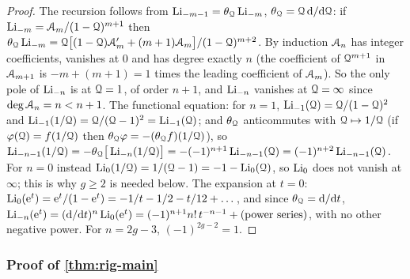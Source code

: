\begin{proof}
The recursion follows from $\Li_{-m-1}=\thQ\Li_{-m}$, $\thQ=\cQ\,\dd/\dd\cQ$: if $\Li_{-m}=\Aeul_m/(1-\cQ)^{m+1}$ then $\thQ\Li_{-m}=\cQ\big[(1-\cQ)\Aeul_m'+(m+1)\Aeul_m\big]/(1-\cQ)^{m+2}$. By induction $\Aeul_n$ has integer coefficients, vanishes at $0$ and has degree exactly $n$ (the coefficient of $\cQ^{m+1}$ in $\Aeul_{m+1}$ is $-m+(m+1)=1$ times the leading coefficient of $\Aeul_m$). So the only pole of $\Li_{-n}$ is at $\cQ=1$, of order $n+1$, and $\Li_{-n}$ vanishes at $\cQ=\infty$ since $\deg\Aeul_n=n<n+1$. The functional equation: for $n=1$, $\Li_{-1}(\cQ)=\cQ/(1-\cQ)^2$ and $\Li_{-1}(1/\cQ)=\cQ/(\cQ-1)^2=\Li_{-1}(\cQ)$; and $\thQ$ anticommutes with $\cQ\mapsto 1/\cQ$ (if $\varphi(\cQ)=f(1/\cQ)$ then $\thQ\varphi=-(\thQ f)(1/\cQ)$), so $\Li_{-n-1}(1/\cQ)=-\thQ\big[\Li_{-n}(1/\cQ)\big]=-(-1)^{n+1}\Li_{-n-1}(\cQ)=(-1)^{n+2}\Li_{-n-1}(\cQ)$. For $n=0$ instead $\Li_0(1/\cQ)=1/(\cQ-1)=-1-\Li_0(\cQ)$, so $\Li_0$ does not vanish at $\infty$; this is why $g\geq 2$ is needed below. The expansion at $t=0$: $\Li_0(\re^t)=\re^t/(1-\re^t)=-1/t-1/2-t/12+\dots$, and since $\thQ=\dd/\dd t$, $\Li_{-n}(\re^t)=(\dd/\dd t)^n\Li_0(\re^t)=(-1)^{n+1}n!\,t^{-n-1}+(\text{power series})$, with no other negative power. For $n=2g-3$, $(-1)^{2g-2}=1$.
\end{proof}

\subsubsection*{Proof of \cref{thm:rig-main}}
\label{sec:rig-proof}


